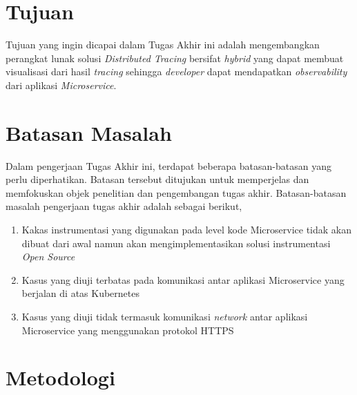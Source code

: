 \section{Tujuan}

Tujuan yang ingin dicapai dalam Tugas Akhir ini adalah mengembangkan perangkat lunak solusi \textit{Distributed Tracing} bersifat \textit{hybrid} yang dapat membuat visualisasi dari hasil \textit{tracing} sehingga \textit{developer} dapat mendapatkan \textit{observability} dari aplikasi \textit{Microservice}.

\section{Batasan Masalah}

Dalam pengerjaan Tugas Akhir ini, terdapat beberapa batasan-batasan yang perlu diperhatikan. Batasan tersebut ditujukan untuk memperjelas dan memfokuskan objek penelitian dan pengembangan tugas akhir. Batasan-batasan masalah pengerjaan tugas akhir adalah sebagai berikut,

\begin{enumerate}
	\item Kakas instrumentasi yang digunakan pada level kode Microservice tidak akan dibuat dari awal namun akan mengimplementasikan solusi instrumentasi \textit{Open Source}
	\item Kasus yang diuji terbatas pada komunikasi antar aplikasi Microservice yang berjalan di atas Kubernetes
	\item Kasus yang diuji tidak termasuk komunikasi \textit{network} antar aplikasi Microservice yang menggunakan protokol HTTPS
\end{enumerate}

\section{Metodologi}

